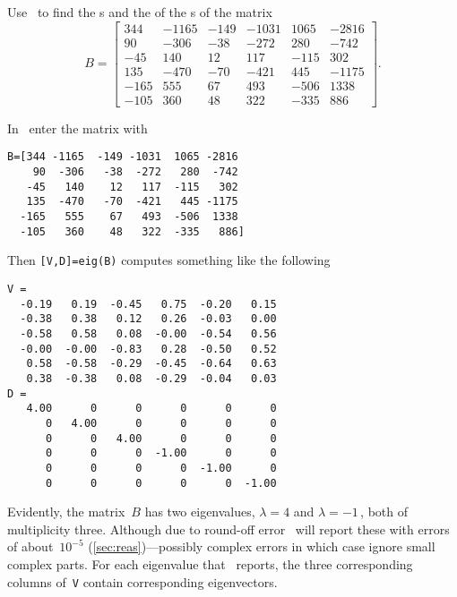 \begin{example} 
Use \script\ to find the s and the  of the s of the matrix 
\begin{equation*}
B=\begin{bmatrix} 344&-1165&-149&-1031&1065&-2816
\\90&-306&-38&-272&280&-742
\\-45&140&12&117&-115&302
\\135&-470&-70&-421&445&-1175
\\-165&555&67&493&-506&1338
\\-105&360&48&322&-335&886 \end{bmatrix}.
\end{equation*}

\begin{solution} 
In \script\ enter the matrix with
\begin{verbatim}
B=[344 -1165  -149 -1031  1065 -2816
    90  -306   -38  -272   280  -742
   -45   140    12   117  -115   302
   135  -470   -70  -421   445 -1175
  -165   555    67   493  -506  1338
  -105   360    48   322  -335   886]
\end{verbatim}
\setbox\ajrqrbox\hbox{}%
\marginajrbox%
Then \verb|[V,D]=eig(B)| computes something like the following \twodp
\begin{verbatim}
V =
  -0.19   0.19  -0.45   0.75  -0.20   0.15
  -0.38   0.38   0.12   0.26  -0.03   0.00
  -0.58   0.58   0.08  -0.00  -0.54   0.56
  -0.00  -0.00  -0.83   0.28  -0.50   0.52
   0.58  -0.58  -0.29  -0.45  -0.64   0.63
   0.38  -0.38   0.08  -0.29  -0.04   0.03
D =
   4.00      0      0      0      0      0
      0   4.00      0      0      0      0
      0      0   4.00      0      0      0
      0      0      0  -1.00      0      0
      0      0      0      0  -1.00      0
      0      0      0      0      0  -1.00
\end{verbatim}
Evidently, the matrix~\(B\) has two eigenvalues, \(\lambda=4\) and \(\lambda=-1\)\,, both of multiplicity three.
Although due to round-off error \script\ will report these with errors of about~\(10^{-5}\) (\autoref{sec:reas})---possibly complex errors in which case ignore small complex parts.
For each eigenvalue that \script\ reports, the three corresponding columns of~\verb|V| contain corresponding eigenvectors.

\end{solution}
\end{example}
